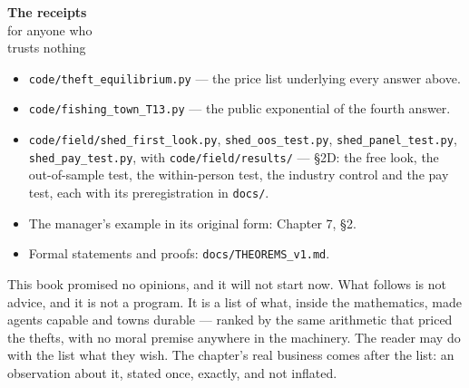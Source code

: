 \begin{receipts}{\textbf{The receipts}\\for anyone who\\trusts nothing}


\begin{itemize}
\tightlist
\item
  \texttt{code/\allowbreak{}theft\_\allowbreak{}equilibrium.\allowbreak{}py} --- the price list underlying every
  answer above.
\item
  \texttt{code/\allowbreak{}fishing\_\allowbreak{}town\_\allowbreak{}T13.\allowbreak{}py} --- the public exponential of the fourth
  answer.
\item
  \texttt{code/\allowbreak{}field/\allowbreak{}shed\_\allowbreak{}first\_\allowbreak{}look.\allowbreak{}py}, \texttt{shed\_\allowbreak{}oos\_\allowbreak{}test.\allowbreak{}py},
  \texttt{shed\_\allowbreak{}panel\_\allowbreak{}test.\allowbreak{}py}, \texttt{shed\_\allowbreak{}pay\_\allowbreak{}test.\allowbreak{}py}, with
  \texttt{code/\allowbreak{}field/\allowbreak{}results/\allowbreak{}} --- §2D: the free look, the out-of-sample test,
  the within-person test, the industry control and the pay test, each
  with its preregistration in \texttt{docs/\allowbreak{}}.
\item
  The manager's example in its original form: Chapter 7, §2.
\item
  Formal statements and proofs: \texttt{docs/\allowbreak{}THEOREMS\_\allowbreak{}v1.\allowbreak{}md}.
\end{itemize}

\end{receipts}




This book promised no opinions, and it will not start now. What
follows is not advice, and it is not a program. It is a list of what,
inside the mathematics, made agents capable and towns durable ---
ranked by the same arithmetic that priced the thefts, with no moral
premise anywhere in the machinery. The reader may do with the list
what they wish. The chapter's real business comes after the list:
an observation about it, stated once, exactly, and not inflated.

